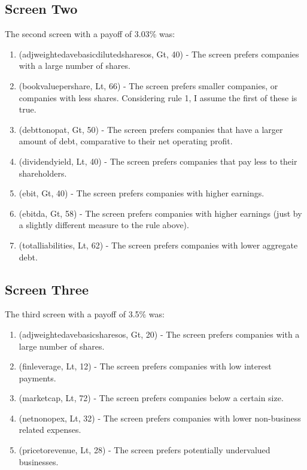 \subsection{Screen Two}
The second screen with a payoff of 3.03\% was:
\begin{enumerate}
    \item (adjweightedavebasicdilutedsharesos, Gt, 40) - The screen prefers companies with a large number of shares.
    \item (bookvaluepershare, Lt, 66) - The screen prefers smaller companies, or companies with less shares. Considering rule 1, I assume the first of these is true.
    \item (debttonopat, Gt, 50) - The screen prefers companies that have a larger amount of debt, comparative to their net operating profit.
    \item (dividendyield, Lt, 40) - The screen prefers companies that pay less to their shareholders.
    \item (ebit, Gt, 40) - The screen prefers companies with higher earnings.
    \item (ebitda, Gt, 58) - The screen prefers companies with higher earnings (just by a slightly different measure to the rule above).
    \item (totalliabilities, Lt, 62) - The screen prefers companies with lower aggregate debt.
\end{enumerate}

\subsection{Screen Three}
The third screen with a payoff of 3.5\% was:
\begin{enumerate}
    \item (adjweightedavebasicsharesos, Gt, 20) - The screen prefers companies with a large number of shares.
    \item (finleverage, Lt, 12) - The screen prefers companies with low interest payments.
    \item (marketcap, Lt, 72) - The screen prefers companies below a certain size.
    \item (netnonopex, Lt, 32) - The screen prefers companies with lower non-business related expenses.
    \item (pricetorevenue, Lt, 28) - The screen prefers potentially undervalued businesses.
\end{enumerate}

